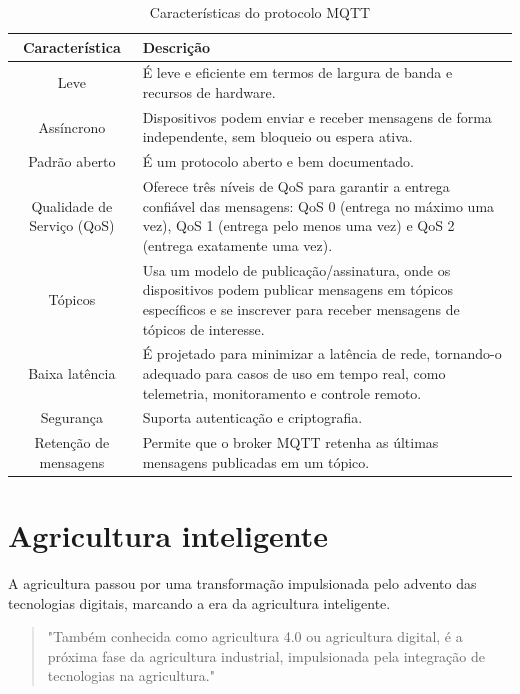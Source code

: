 \begin{table}[!htb]
  \caption{Características do protocolo MQTT} \label{tab:caract_mqtt}
  \begin{tabularx}{\textwidth}{|c|X|} \hline
    \textbf{Característica} & \textbf{Descrição} \\ \hline
    Leve & É leve e eficiente em termos de largura de banda e recursos de hardware. \\ \hline
    Assíncrono & Dispositivos podem enviar e receber mensagens de forma independente, sem bloqueio ou espera ativa. \\ \hline
    Padrão aberto & É um protocolo aberto e bem documentado. \\ \hline
    Qualidade de Serviço (QoS) & Oferece três níveis de QoS para garantir a entrega confiável das mensagens: QoS 0 (entrega no máximo uma vez), QoS 1 (entrega pelo menos uma vez) e QoS 2 (entrega exatamente uma vez). \\ \hline
    Tópicos & Usa um modelo de publicação/assinatura, onde os dispositivos podem publicar mensagens em tópicos específicos e se inscrever para receber mensagens de tópicos de interesse. \\ \hline  
    Baixa latência &  É projetado para minimizar a latência de rede, tornando-o adequado para casos de uso em tempo real, como telemetria, monitoramento e controle remoto. \\ \hline
    Segurança & Suporta autenticação e criptografia. \\ \hline
    Retenção de mensagens & Permite que o broker MQTT retenha as últimas mensagens publicadas em um tópico. \\ \hline  
  \end{tabularx}
\end{table}

\section{Agricultura inteligente}
A agricultura passou por uma transformação impulsionada pelo advento das tecnologias digitais, marcando a era da agricultura inteligente. 

\begin{quote}
  "Também conhecida como agricultura 4.0 ou agricultura digital, é a próxima fase da agricultura industrial, impulsionada pela integração de tecnologias na agricultura." \parencite[{p. 424}]{Gurjeet_smart2022}
\end{quote}

